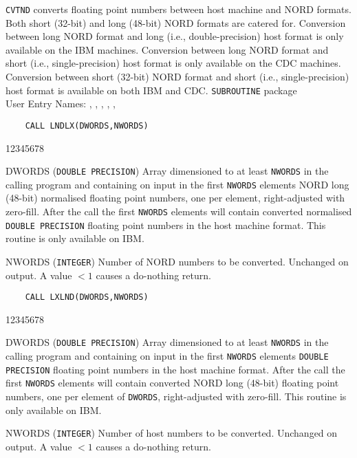                   
\Submitter{}                                  
{\tt CVTND} converts floating point numbers between host machine and
NORD formats. Both short (32-bit) and long (48-bit) NORD formats are
catered for. Conversion between long NORD format and long
(i.e., double-precision) host format is only available on the IBM
machines. Conversion between long NORD format and short
(i.e., single-precision) host format is only available on the CDC
machines. Conversion between short (32-bit) NORD format and short
(i.e., single-precision) host format is available on both IBM and CDC.
\Structure
{\tt SUBROUTINE} package \\
User   Entry  Names: , , ,
, , 
\Usage
\begin{verbatim}
    CALL LNDLX(DWORDS,NWORDS)
\end{verbatim}
\begin{DLtt}{12345678}
\item [DWORDS] ({\tt DOUBLE PRECISION}) Array dimensioned to at least
{\tt NWORDS} in the calling program and containing on input in the first
{\tt NWORDS} elements NORD long (48-bit) normalised floating point
numbers, one per element, right-adjusted with zero-fill. After the call
the first {\tt NWORDS} elements will contain converted normalised
{\tt DOUBLE PRECISION} floating point numbers in the
host machine format. This routine is only available on IBM.
\item [NWORDS] ({\tt INTEGER}) Number of NORD numbers to be converted.
Unchanged on output. A value $< 1$ causes a do-nothing return.
\end{DLtt}
\begin{verbatim}
    CALL LXLND(DWORDS,NWORDS)
\end{verbatim}
\begin{DLtt}{12345678}
\item [DWORDS] ({\tt DOUBLE PRECISION}) Array dimensioned to at least
{\tt NWORDS} in the calling program and containing on input in the first
{\tt NWORDS} elements {\tt DOUBLE PRECISION} floating point
numbers in the host machine format. After the call the first {\tt NWORDS}
elements will contain converted NORD long (48-bit) floating point
numbers, one per element of {\tt DWORDS}, right-adjusted with
zero-fill. This routine is only available on IBM.
\item [NWORDS] ({\tt INTEGER}) Number of host numbers to be converted.
Unchanged on output. A value $< 1$ causes a do-nothing return.
\end{DLtt}
